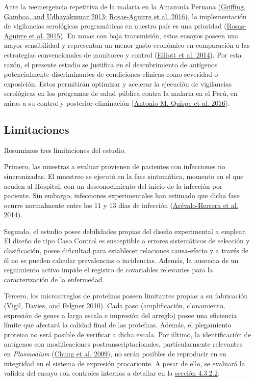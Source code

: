 \documentclass[
  a4paper]{article}
\begin{document}
Ante la reemergencia repetitiva de la malaria en la Amazonía Peruana
(\protect\hyperlink{ref-griffing2013history}{Griffing, Gamboa, and
Udhayakumar 2013}; \protect\hyperlink{ref-rosas2016peru}{Rosas-Aguirre
et al. 2016}), la implementación de vigilancias serológicas
programáticas en nuestro país es una prioridad
(\protect\hyperlink{ref-hotspots2015}{Rosas-Aguirre et al. 2015}). En
zonas con baja transmisión, estos ensayos poseen una mayor sensibilidad
y representan un menor gasto económico en comparación a las estrategias
convencionales de monitoreo y control
(\protect\hyperlink{ref-elliott2014}{Elliott et al. 2014}). Por esta
razón, el presente estudio se justifica en el descubrimiento de
antígenos potencialmente discriminantes de condiciones clínicas como
severidad o exposición. Estos permitirán optimizar y acelerar la
ejecución de vigilancias serológicas en los programas de salud pública
contra la malaria en el Perú, en miras a su control y posterior
eliminación (\protect\hyperlink{ref-accelerate2016}{Antonio M. Quispe et
al. 2016}).

\hypertarget{limit}{%
\subsection{Limitaciones}\label{limit}}

Resumimos tres limitaciones del estudio.

Primero, las muestras a evaluar provienen de pacientes con infecciones
no sincronizadas. El muestreo se ejecutó en la fase sintomática, momento
en el que acuden al Hospital, con un desconocimiento del inicio de la
infección por paciente. Sin embargo, infecciones experimentales han
estimado que dicha fase ocurre normalmente entre los 11 y 13 días de
infección (\protect\hyperlink{ref-arevalo2014}{Arévalo-Herrera et al.
2014}).

Segundo, el estudio posee debilidades propias del diseño experimental a
emplear. El diseño de tipo Caso Control es susceptible a errores
sistemáticos de selección y clasificación, posee dificultad para
establecer relaciones causa-efecto y a través de él no se pueden
calcular prevalencias o incidencias. Además, la ausencia de un
seguimiento activo impide el registro de covariables relevantes para la
caracterización de la enfermedad.

Tercero, los microarreglos de proteínas poseen limitantes propias a su
fabricación (\protect\hyperlink{ref-vigil2010}{Vigil, Davies, and
Felgner 2010}). Cada paso (amplificación, clonamiento, expresión de
genes a larga escala e impresión del arreglo) posee una eficiencia
límite que afectará la calidad final de las proteínas. Además, el
plegamiento proteico no será posible de verificar a dicha escala. Por
último, la identificación de antígenos con modificaciones
postranscriptacionales, particularmente relevantes en \emph{Plasmodium}
(\protect\hyperlink{ref-leroch2009postmod}{Chung et al. 2009}), no serán
posibles de reproducir en su integridad en el sistema de expresión
procarionte. A pesar de ello, se evaluará la validez del ensayo con
controles internos a detallar en la \protect\hyperlink{validez}{sección
4.3.2.2}.
\end{document}
